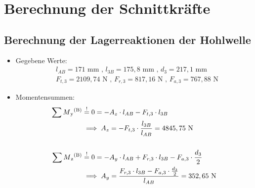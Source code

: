\newpage
\chapter{Berechnung der Schnittkräfte}
\section{Berechnung der Lagerreaktionen der Hohlwelle}
\begin{itemize}
	\item Gegebene Werte: 
\begin{align*}
	&l_{AB} =171\text{ mm} \text{ , } l_{3B} = 175,8\text{ mm} \text{ , } d_{3} = 217,1\text{ mm}\\
	&F_{t,3} = 2109,74 \text{ N} \text{ , } F_{r,3}  = 817,16\text{ N} \text{ , } F_{a,3} = 767,88 \text{ N}
\end{align*}
	\item Momentensummen:
\begin{align*}
	 \sum M\textsubscript{y}\textsuperscript{(B)} &\overset{!}{=} 0 = -A_z \cdot l_{AB} - F_{t,3} \cdot l_{3B} \\
	 	&\implies A_z = -F_{t,3} \cdot \frac{l_{3B}}{l_{AB}} = 4845,75 \text{ N} \\ \\
	 \sum M\textsubscript{z}\textsuperscript{(B)} &\overset{!}{=} 0 = -A_y \cdot l_{AB} + F_{r,3} \cdot l_{3B} - F_{a,3} \cdot \frac{d_3}{2}\\
	 	&\implies A_y = \frac{F_{r,3} \cdot l_{3B} - F_{a,3} \cdot \frac{d_3}{2}} {l_{AB}}= 352,65 \text{ N} 
\end{align*}
\end{itemize}
